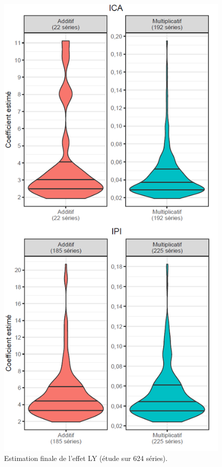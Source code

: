 \documentclass[12pt, a4paper, french]{article}
\begin{document}
\begin{figure}[!ht]
\begin{center}
 \includegraphics[scale=0.65]{img/LYvaleur2.png}
 \caption{Estimation finale de l'effet LY (étude sur 624 séries).}
 \label{fig:LYvaleur}
\end{center}
\end{figure}
\end{document}

